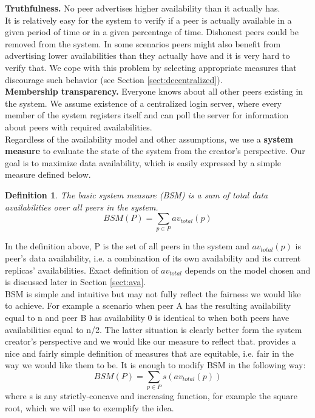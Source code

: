 \documentclass{pracamgren}
\newcounter{collective_ctr} \numberwithin{collective_ctr}{chapter}
\newtheorem{definition}[collective_ctr]{Definition}
\begin{document}
{\bf Truthfulness.} No peer advertises higher availability than it actually has.\\
It is relatively easy for the system to verify if a peer is actually available in a given period of time or in a given percentage of time. Dishonest peers could be removed from the system. In some scenarios peers might also benefit from advertising lower availabilities than they actually have and it is very hard to verify that. We cope with this problem by selecting appropriate measures that discourage such behavior (see Section \ref{sect:decentralized}).\\

{\bf Membership transparency.} Everyone knows about all other peers existing in the system. We assume existence of a centralized login server, where every member of the system registers itself and can poll the server for information about peers with required availabilities.\\

Regardless of the availability model and other assumptions, we use a {\bf system measure} to evaluate the state of the system from the creator's perspective. Our goal is to maximize data availability, which is easily expressed by a simple measure defined below.

\begin{definition}
The {\it basic system measure (BSM)} is a sum of total data availabilities over all peers in the system.
$$BSM(P) = \sum_{p\in P} av_{total}(p)$$
\end{definition}


In the definition above, P is the set of all peers in the system and $av_{total}(p)$ is peer's data availability, i.e. a combination of its own availability and its current replicas' availabilities. Exact definition of $av_{total}$ depends on the model chosen and is discussed later in Section \ref{sect:ava}.\\

BSM is simple and intuitive but may not fully reflect the fairness we would like to achieve. For example a scenario when peer A has the resulting availability equal to n and peer B has availability 0 is identical to when both peers have availabilities equal to n/2. The latter situation is clearly better form the system creator's perspective and we would like our measure to reflect that. \cite{equitable} provides a nice and fairly simple definition of measures that are equitable, i.e. fair in the way we would like them to be. It is enough to modify BSM in the following way:\\
$$BSM(P) = \sum_{p\in P} s(av_{total}(p))$$
where s is any strictly-concave and increasing function, for example the square root, which we will use to exemplify the idea.\\
\end{document}
